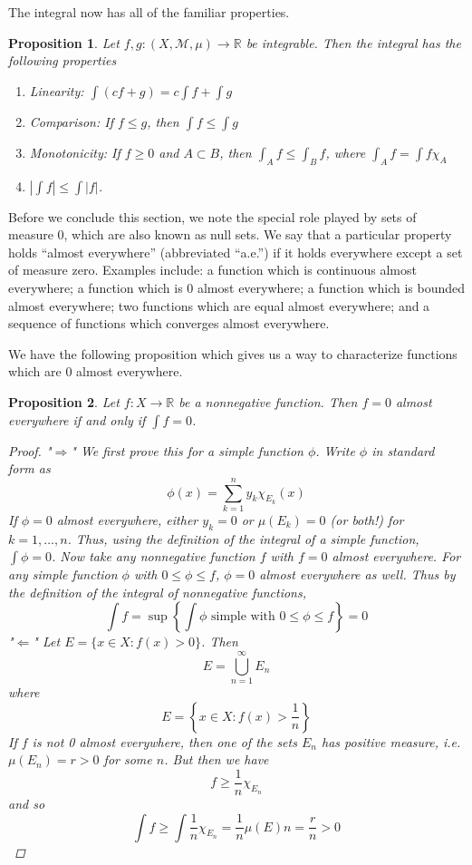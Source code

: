 \documentclass[10pt]{article}         %
\newtheorem{proposition}{Proposition}[section]
\theoremstyle{remark}
\newcommand{\R}{\mathbb{R}}
\begin{document}
The integral now has all of the familiar properties.

\begin{proposition}
Let $f, g:(X, \mathcal{M}, \mu) \rightarrow \R$ be integrable. Then the integral has the following properties
\begin{enumerate}
\item Linearity: $\int(c f + g) = c \int f + \int g$
\item Comparison: If $f\leq g$, then $\int f \leq \int g$
\item Monotonicity: If $f\geq 0$ and $A\subset B$, then $\int_A f \leq\int_B f$, where $\int_A f = \int f \chi_A$
\item $|\int f| \leq \int |f| $.
\end{enumerate}
\end{proposition}

Before we conclude this section, we note the special role played by sets of measure 0, which are also known as null sets. We say that a particular property holds ``almost everywhere'' (abbreviated ``a.e.'') if it holds everywhere except a set of measure zero. Examples include: a function which is continuous almost everywhere; a function which is 0 almost everywhere; a function which is bounded almost everywhere; two functions which are equal almost everywhere; and a sequence of functions which converges almost everywhere.

We have the following proposition which gives us a way to characterize functions which are 0 almost everywhere.

\begin{proposition}
Let $f: X \rightarrow \R$ be a nonnegative function. Then $f = 0$ almost everywhere if and only if $\int f = 0$.
\begin{proof}
"$\Rightarrow$" We first prove this for a simple function $\phi$. Write $\phi$ in standard form as 
\[
\phi(x) = \sum_{k = 1}^n
y_k \chi_{E_k}(x)
\]
If $\phi = 0$ almost everywhere, either $y_k = 0$ or $\mu(E_k) = 0$ (or both!) for $k = 1, \dots, n$. Thus, using the definition of the integral of a simple function, $\int \phi = 0$. Now take any nonnegative function $f$ with $f = 0$ almost everywhere. For any simple function $\phi$ with $0 \leq \phi \leq f$, $\phi = 0$ almost everywhere as well. Thus by the definition of the integral of nonnegative functions,
\[
\int f = \sup\left\{ \int \phi \text{ simple with }0 \leq \phi \leq f \right\} = 0
\]
"$\Leftarrow$" Let $E = \{ x \in X : f(x) > 0 \}$. Then 
\[
E = \bigcup_{n=1}^\infty E_n
\]
where
\[
E = \left\{ x \in X : f(x) > \frac{1}{n} \right\}
\]
If $f$ is not 0 almost everywhere, then one of the sets $E_n$ has positive measure, i.e. $\mu(E_n) = r > 0$ for some $n$. But then we have
\[
f \geq \frac{1}{n}\chi_{E_n}
\]
and so
\[
\int f \geq \int \frac{1}{n}\chi_{E_n} = \frac{1}{n} \mu(E)n = \frac{r}{n} > 0
\]
\end{proof}
\end{proposition}
\end{document}
